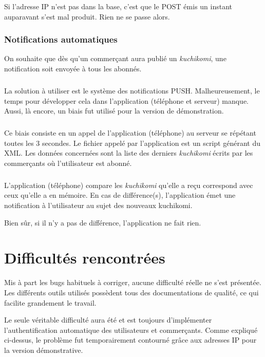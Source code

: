 \documentclass[a4paper,12pt,titlepage]{report}
\begin{document}
Si l'adresse IP n'est pas dans la base, c'est que le POST émis un instant auparavant s'est mal produit. Rien ne se passe alors.

\newpage

\subsection{Notifications automatiques}

On souhaite que dès qu'un commerçant aura publié un \emph{kuchikomi}, une notification soit envoyée à tous les abonnés.
\paragraph*{}
La solution à utiliser est le système des notifications PUSH. Malheureusement, le temps pour développer cela dans l'application (téléphone et serveur) manque. Aussi, là encore, un biais fut utilisé pour la version de démonstration.
\paragraph*{}
Ce biais consiste en un appel de l'application (téléphone) au serveur se répétant toutes les 3 secondes. Le fichier appelé par l'application est un script générant du XML. Les données concernées sont la liste des derniers \emph{kuchikomi} écrits par les commerçants où l'utilisateur est abonné.
\paragraph*{}
L'application (téléphone) compare les \emph{kuchikomi} qu'elle a reçu correspond  avec ceux qu'elle a en mémoire. En cas de différence(s), l'application émet une notification à l'utilisateur au sujet des nouveaux kuchikomi.

Bien sûr, si il n'y a pas de différence, l'application ne fait rien.


\chapter{Difficultés rencontrées}

Mis à part les bugs habituels à corriger, aucune difficulté réelle ne s'est présentée. Les différents outils utilisés possèdent tous des documentations de qualité, ce qui facilite grandement le travail.

Le seule véritable difficulté aura été et est toujours d'implémenter l'authentification automatique des utilisateurs et commerçants. Comme expliqué ci-dessus, le problème fut temporairement contourné grâce aux adresses IP pour la version démonstrative.
\end{document}
